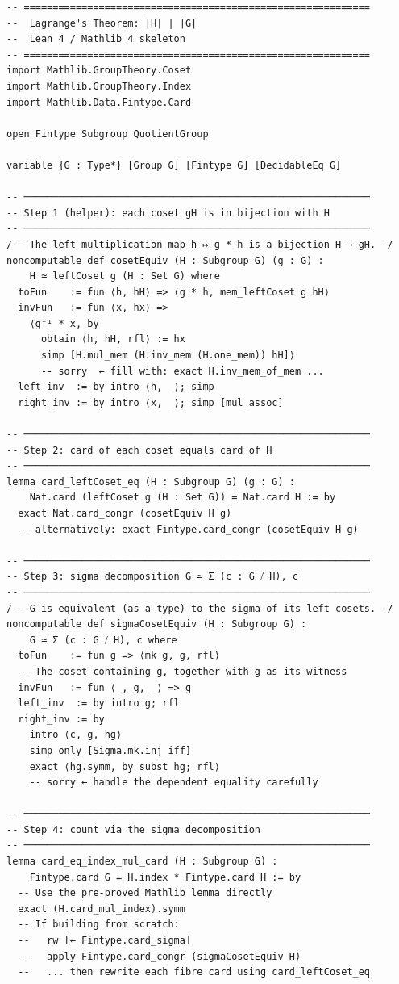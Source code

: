 \documentclass[11pt, a4paper]{article}
\theoremstyle{plain}
\theoremstyle{definition}
\begin{document}
\begin{lstlisting}
-- ============================================================
--  Lagrange's Theorem: |H| ∣ |G|
--  Lean 4 / Mathlib 4 skeleton
-- ============================================================
import Mathlib.GroupTheory.Coset
import Mathlib.GroupTheory.Index
import Mathlib.Data.Fintype.Card

open Fintype Subgroup QuotientGroup

variable {G : Type*} [Group G] [Fintype G] [DecidableEq G]

-- ────────────────────────────────────────────────────────────
-- Step 1 (helper): each coset gH is in bijection with H
-- ────────────────────────────────────────────────────────────
/-- The left-multiplication map h ↦ g * h is a bijection H → gH. -/
noncomputable def cosetEquiv (H : Subgroup G) (g : G) :
    H ≃ leftCoset g (H : Set G) where
  toFun    := fun ⟨h, hH⟩ => ⟨g * h, mem_leftCoset g hH⟩
  invFun   := fun ⟨x, hx⟩ =>
    ⟨g⁻¹ * x, by
      obtain ⟨h, hH, rfl⟩ := hx
      simp [H.mul_mem (H.inv_mem (H.one_mem)) hH]⟩
      -- sorry  ← fill with: exact H.inv_mem_of_mem ...
  left_inv  := by intro ⟨h, _⟩; simp
  right_inv := by intro ⟨x, _⟩; simp [mul_assoc]

-- ────────────────────────────────────────────────────────────
-- Step 2: card of each coset equals card of H
-- ────────────────────────────────────────────────────────────
lemma card_leftCoset_eq (H : Subgroup G) (g : G) :
    Nat.card (leftCoset g (H : Set G)) = Nat.card H := by
  exact Nat.card_congr (cosetEquiv H g)
  -- alternatively: exact Fintype.card_congr (cosetEquiv H g)

-- ────────────────────────────────────────────────────────────
-- Step 3: sigma decomposition G ≃ Σ (c : G ⧸ H), c
-- ────────────────────────────────────────────────────────────
/-- G is equivalent (as a type) to the sigma of its left cosets. -/
noncomputable def sigmaCosetEquiv (H : Subgroup G) :
    G ≃ Σ (c : G ⧸ H), c where
  toFun    := fun g => ⟨mk g, g, rfl⟩
  -- The coset containing g, together with g as its witness
  invFun   := fun ⟨_, g, _⟩ => g
  left_inv  := by intro g; rfl
  right_inv := by
    intro ⟨c, g, hg⟩
    simp only [Sigma.mk.inj_iff]
    exact ⟨hg.symm, by subst hg; rfl⟩
    -- sorry ← handle the dependent equality carefully

-- ────────────────────────────────────────────────────────────
-- Step 4: count via the sigma decomposition
-- ────────────────────────────────────────────────────────────
lemma card_eq_index_mul_card (H : Subgroup G) :
    Fintype.card G = H.index * Fintype.card H := by
  -- Use the pre-proved Mathlib lemma directly
  exact (H.card_mul_index).symm
  -- If building from scratch:
  --   rw [← Fintype.card_sigma]
  --   apply Fintype.card_congr (sigmaCosetEquiv H)
  --   ... then rewrite each fibre card using card_leftCoset_eq


\end{lstlisting}
\end{document}
